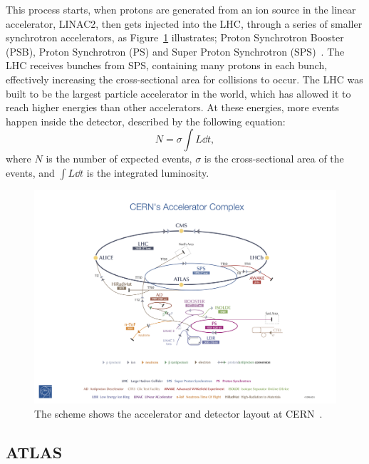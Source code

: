 \documentclass[12pt,a4paper]{article}
\numberwithin{equation}{section}
\begin{document}
This process starts, when protons are generated from an ion source in the linear
accelerator, LINAC2, then gets injected into the LHC, through a series of
smaller synchrotron accelerators, as Figure~\ref{fig:lhc} illustrates; Proton
Synchrotron Booster (PSB), Proton Synchrotron (PS) and Super Proton Synchrotron
(SPS)~\cite[135]{Evans_2008}. The LHC receives bunches from SPS, containing many
protons in each bunch, effectively increasing the cross-sectional area for
collisions to occur. The LHC was built to be the largest particle accelerator in the
world, which has allowed it to reach higher energies than other accelerators. At
these energies, more events happen inside the detector, described by the
following equation:
\begin{equation}
  N = \sigma \int L \dd t,
\end{equation}
where $N$ is the number of expected events, $\sigma$ is the cross-sectional area of
the events, and $\int L \dd t$ is the integrated luminosity.

\begin{figure}[H]
	\includegraphics[width=\linewidth]{figures/cern.jpg}
	\caption{The scheme shows the accelerator and detector layout at
    CERN~\cite{Haffner:1621894}.}\label{fig:lhc}
\end{figure}


\subsection{ATLAS}
\end{document}
